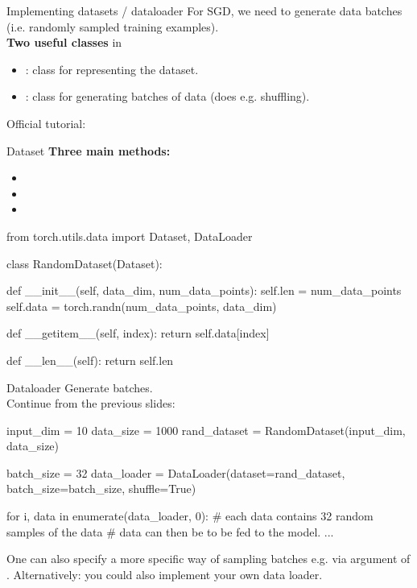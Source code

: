 \begin{frame}{Implementing datasets / dataloader}
For SGD, we need to generate data batches (i.e. randomly sampled training examples).\\
\vsp
\textbf{Two useful classes} in 
\begin{itemize}
\item {}: class for representing the dataset.
\item {}: class for generating batches of data (does e.g. shuffling).
\end{itemize}
\vsp
Official tutorial: 
\end{frame}

\begin{frame}[fragile]{Dataset}
\vspace{-4mm}
\textbf{Three main methods:}
\begin{itemize}
\item {}
\item {}
\item {}
\end{itemize} 
\begin{python}
from torch.utils.data import Dataset, DataLoader

class RandomDataset(Dataset):

    def __init__(self, data_dim, num_data_points):
        self.len = num_data_points
        self.data = torch.randn(num_data_points, data_dim)

    def __getitem__(self, index):
        return self.data[index]

    def __len__(self):
        return self.len
\end{python}
\end{frame}

\begin{frame}[fragile]{Dataloader}
Generate batches.\\
Continue from the previous slides:
\begin{python}
input_dim = 10 
data_size = 1000
rand_dataset = RandomDataset(input_dim, data_size)

batch_size = 32
data_loader =
  DataLoader(dataset=rand_dataset,
             batch_size=batch_size, shuffle=True)

for i, data in enumerate(data_loader, 0):
    # each data contains 32 random samples of the data
    # data can then be to be fed to the model.
    ...
\end{python}
One can also specify a more specific way of sampling batches e.g. via  argument of .
Alternatively: you could also implement your own data loader.
\end{frame}


